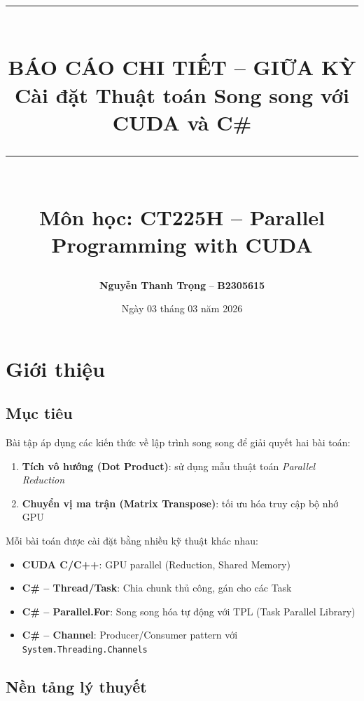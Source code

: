 \documentclass[12pt,a4paper]{article}
\title{
    \vspace{-1cm}
    \rule{\linewidth}{1pt}\\[0.3cm]
    {\LARGE \textbf{BÁO CÁO CHI TIẾT -- GIỮA KỲ}}\\[0.3cm]
    {\Large Cài đặt Thuật toán Song song với CUDA và C\#}\\[0.2cm]
    \rule{\linewidth}{1pt}\\[0.5cm]
    {\normalsize Môn học: \textbf{CT225H -- Parallel Programming with CUDA}}
}
\author{
    \textbf{Nguyễn Thanh Trọng} -- \textbf{B2305615}
}
\date{Ngày 03 tháng 03 năm 2026}
\begin{document}
\maketitle
\thispagestyle{fancy}

\tableofcontents
\newpage

\section{Giới thiệu}

\subsection{Mục tiêu}
Bài tập áp dụng các kiến thức về lập trình song song để giải quyết hai bài toán:
\begin{enumerate}[nosep]
    \item \textbf{Tích vô hướng (Dot Product)}: sử dụng mẫu thuật toán \textit{Parallel Reduction}
    \item \textbf{Chuyển vị ma trận (Matrix Transpose)}: tối ưu hóa truy cập bộ nhớ GPU
\end{enumerate}

Mỗi bài toán được cài đặt bằng nhiều kỹ thuật khác nhau:
\begin{itemize}[nosep]
    \item \textbf{CUDA C/C++}: GPU parallel (Reduction, Shared Memory)
    \item \textbf{C\# -- Thread/Task}: Chia chunk thủ công, gán cho các Task
    \item \textbf{C\# -- Parallel.For}: Song song hóa tự động với TPL (Task Parallel Library)
    \item \textbf{C\# -- Channel}: Producer/Consumer pattern với \texttt{System.Threading.Channels}
\end{itemize}

\subsection{Nền tảng lý thuyết}
\end{document}
